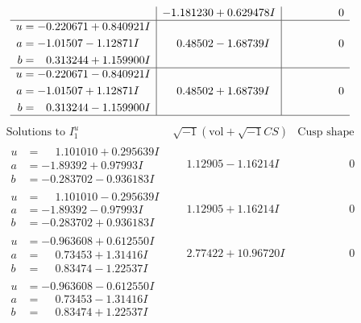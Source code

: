 \documentclass[1p]{elsarticle_modified}
\theoremstyle{definition}
\newcommand{\I}{\sqrt{-1}}
\begin{document}
$$\begin{array}{c|c|c}
 & -1.181230 + 0.629478 I & \phantom{-0.000000 } 0 \\ \hline\begin{aligned}
u &= -0.220671 + 0.840921 I \\
a &= -1.01507 - 1.12871 I \\
b &= \phantom{-}0.313244 + 1.159900 I\end{aligned}
 & \phantom{-}0.48502 - 1.68739 I & \phantom{-0.000000 } 0 \\ \hline\begin{aligned}
u &= -0.220671 - 0.840921 I \\
a &= -1.01507 + 1.12871 I \\
b &= \phantom{-}0.313244 - 1.159900 I\end{aligned}
 & \phantom{-}0.48502 + 1.68739 I & \phantom{-0.000000 } 0\\
 \hline 
 \end{array}$$\newpage$$\begin{array}{c|c|c}  
\text{Solutions to }I^u_{1}& \I (\text{vol} + \sqrt{-1}CS) & \text{Cusp shape}\\
 \hline 
\begin{aligned}
u &= \phantom{-}1.101010 + 0.295639 I \\
a &= -1.89392 + 0.97993 I \\
b &= -0.283702 - 0.936183 I\end{aligned}
 & \phantom{-}1.12905 - 1.16214 I & \phantom{-0.000000 } 0 \\ \hline\begin{aligned}
u &= \phantom{-}1.101010 - 0.295639 I \\
a &= -1.89392 - 0.97993 I \\
b &= -0.283702 + 0.936183 I\end{aligned}
 & \phantom{-}1.12905 + 1.16214 I & \phantom{-0.000000 } 0 \\ \hline\begin{aligned}
u &= -0.963608 + 0.612550 I \\
a &= \phantom{-}0.73453 + 1.31416 I \\
b &= \phantom{-}0.83474 - 1.22537 I\end{aligned}
 & \phantom{-}2.77422 + 10.96720 I & \phantom{-0.000000 } 0 \\ \hline\begin{aligned}
u &= -0.963608 - 0.612550 I \\
a &= \phantom{-}0.73453 - 1.31416 I \\
b &= \phantom{-}0.83474 + 1.22537 I\end{aligned}

\end{array}$$
\end{document}
